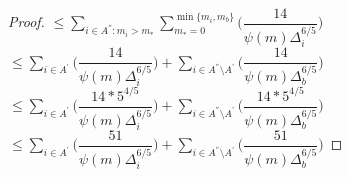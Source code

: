 \begin{proof}
\newline
\hspace*{0em}$\leq\sum_{i\in A^{''}:m_{i}>m_{*}}\sum_{m_{*}=0}^{\min{\lbrace m_{i},m_{b}\rbrace}}\bigg(\dfrac{14}{\psi(m)\Delta_{i}^{6/5}} \bigg) $
\newline
\hspace*{0em}$\leq\sum_{i\in A^{'}}\bigg(\dfrac{14}{\psi(m)\Delta_{i}^{6/5}} \bigg)+\sum_{i\in A^{''}\setminus A^{'}}\bigg(\dfrac{14}{\psi(m)\Delta_{b}^{6/5}} \bigg)$
\newline
\hspace*{0em}$\leq\sum_{i\in A^{'}}\bigg(\dfrac{14*5^{4/5}}{\psi(m)\Delta_{i}^{6/5}} \bigg)+\sum_{i\in A^{''}\setminus A^{'}}\bigg(\dfrac{14*5^{4/5}}{\psi(m)\Delta_{b}^{6/5}} \bigg)$
\newline
\hspace*{0em}$\leq\sum_{i\in A^{'}}\bigg(\dfrac{51}{\psi(m)\Delta_{i}^{6/5}} \bigg)+\sum_{i\in A^{''}\setminus A^{'}}\bigg(\dfrac{51}{\psi(m)\Delta_{b}^{6/5}} \bigg)$
\end{proof}



